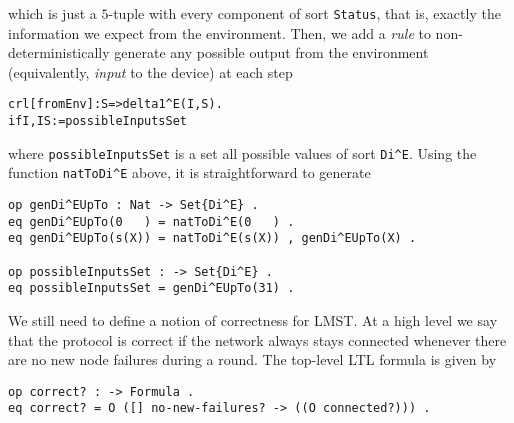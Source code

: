 \documentclass[copyright,creativecommons]{eptcs}
\begin{document}
\noindent
which is just a $5$-tuple with every component of sort {\tt Status}, that is,
exactly the information we expect from the environment. Then, we add a
\emph{rule} to non-deterministically generate any possible output from the
environment (equivalently, \emph{input} to the device) at each step

\begin{center}
\begin{small}
\begin{boxedminipage}{0.60\textwidth}
\begin{alltt}
crl [fromEnv] : S => delta1^E(I, S) .
 if I,IS := possibleInputsSet
\end{alltt}
\end{boxedminipage}
\end{small}
\end{center}

\noindent
where {\tt possibleInputsSet} is a set all possible values of sort {\tt Di\^{}E}.
Using the function {\tt natToDi\^{}E} above, it is straightforward to generate

\begin{center}
\begin{small}
\begin{boxedminipage}{0.75\textwidth}
\begin{verbatim}
op genDi^EUpTo : Nat -> Set{Di^E} .
eq genDi^EUpTo(0   ) = natToDi^E(0   ) .
eq genDi^EUpTo(s(X)) = natToDi^E(s(X)) , genDi^EUpTo(X) .

op possibleInputsSet : -> Set{Di^E} .
eq possibleInputsSet = genDi^EUpTo(31) .
\end{verbatim}
\end{boxedminipage}
\end{small}
\end{center}


We still need to define a notion of correctness for LMST. At a high level we
say that the protocol is correct if the network always stays connected whenever
there are no new node failures during a round. The top-level LTL formula is
given by

\begin{center}
\begin{small}
\begin{boxedminipage}{0.70\textwidth}
\begin{verbatim}
op correct? : -> Formula .
eq correct? = O ([] no-new-failures? -> ((O connected?))) .
\end{verbatim}
\end{boxedminipage}
\end{small}
\end{center}
\end{document}

